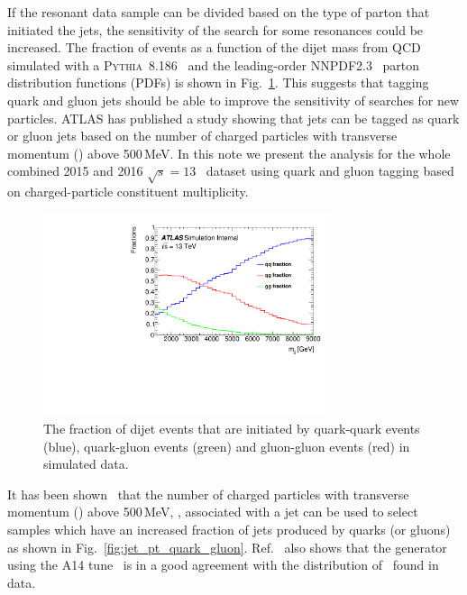 


If the resonant data sample can be divided based on the type of
parton that initiated the jets, the sensitivity of the search for some
resonances could be increased. 
The fraction of events as a function of  
the dijet mass from QCD  simulated with a  \textsc{Pythia~8.186}~\cite{pythia8} and the leading-order NNPDF2.3~\cite{Ball:2012cx} 
parton distribution functions (PDFs) is shown in Fig.~\ref{fig:quarkgluonfraction}. 
This suggests that tagging quark and gluon jets should be able to improve the sensitivity of searches for new particles. 
ATLAS has published a study \cite{ATL-PHYS-PUB-2017-009} showing that jets can be tagged as quark or gluon jets 
based on the number of charged particles with transverse momentum (\pt ) above 500\,MeV. 
In this note we present the analysis for the whole combined 2015 and
2016 $\sqrt{s} = 13$~\TeV\xspace dataset using quark 
and gluon tagging  based on charged-particle constituent multiplicity.


\begin{figure}[htb]
 \centering
\includegraphics[width=0.75\textwidth]{figures/tagging/Fractions_QCD.pdf}
\caption{The fraction of dijet events that are initiated by quark-quark events (blue), quark-gluon 
events (green) and gluon-gluon events (red) in simulated data.  \label{fig:quarkgluonfraction}}
\end{figure}

It has been shown~\cite{ATL-PHYS-PUB-2017-009}  that the number of charged particles with transverse
momentum (\pT ) above 500\,MeV, \ntrk, associated with a jet can be used
to select samples which have an increased fraction of jets produced by
quarks (or gluons) 
as shown in Fig.~\ref{fig:jet_pt_quark_gluon}.
Ref.~\cite{ATL-PHYS-PUB-2017-009} also shows that the 
generator~\cite{pythia8} using the A14 tune~\cite{A14tune} is in a good
agreement with the distribution of \ntrk\ found in data.


